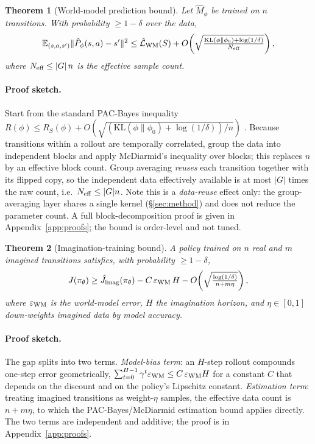 \documentclass[sigconf,anonymous]{acmart}
\newtheorem{theorem}{Theorem}
\begin{document}
\begin{theorem}[World-model prediction bound]\label{th:wm}
Let $\hat M_\phi$ be trained on $n$ transitions. With probability
$\ge1-\delta$ over the data,
\[
  \mathbb E_{(s,a,s')}\|\hat P_\phi(s,a)-s'\|^2
  \le \hat{\mathcal L}_{\rm WM}(S)+
  O\!\left(\sqrt{\tfrac{\mathrm{KL}(\phi\|\phi_0)+\log(1/\delta)}{N_{\rm eff}}}\right),
\]
where $N_{\rm eff}\le |G|\,n$ is the effective sample count.
\end{theorem}

\paragraph{Proof sketch.}
Start from the standard PAC-Bayes inequality
$R(\phi)\le R_S(\phi)+O(\sqrt{(\mathrm{KL}(\phi\|\phi_0)+\log(1/\delta))/n})$
\cite{mcallester1999}. Because transitions within a rollout are temporally
correlated, group the data into independent blocks and apply McDiarmid's
inequality over blocks; this replaces $n$ by an effective block count. Group
averaging \emph{reuses} each transition together with its flipped copy, so
the independent data effectively available is at most $|G|$ times the raw
count, i.e.\ $N_{\rm eff}\le |G|n$. Note this is a \emph{data-reuse} effect
only: the group-averaging layer shares a single kernel (\S\ref{sec:method})
and does not reduce the parameter count. A full block-decomposition proof is
given in Appendix~\ref{app:proofs}; the bound is order-level and not tuned.

\begin{theorem}[Imagination-training bound]\label{th:imag}
A policy trained on $n$ real and $m$ imagined transitions satisfies, with
probability $\ge1-\delta$,
\[
  J(\pi_\theta)\ge \hat J_{\rm imag}(\pi_\theta)
  -C\,\varepsilon_{\rm WM}\,H
  -O\!\left(\sqrt{\tfrac{\log(1/\delta)}{n+m\eta}}\right),
\]
where $\varepsilon_{\rm WM}$ is the world-model error, $H$ the imagination
horizon, and $\eta\in[0,1]$ down-weights imagined data by model accuracy.
\end{theorem}

\paragraph{Proof sketch.}
The gap splits into two terms. \emph{Model-bias term}: an $H$-step rollout
compounds one-step error geometrically,
$\sum_{t=0}^{H-1}\gamma^t\varepsilon_{\rm WM}\le C\,\varepsilon_{\rm WM}H$
for a constant $C$ that depends on the discount and on the policy's Lipschitz
constant. \emph{Estimation term}: treating imagined transitions as
weight-$\eta$ samples, the effective data count is $n+m\eta$, to which the
PAC-Bayes/McDiarmid estimation bound applies directly. The two terms are
independent and additive; the proof is in Appendix~\ref{app:proofs}.
\end{document}
